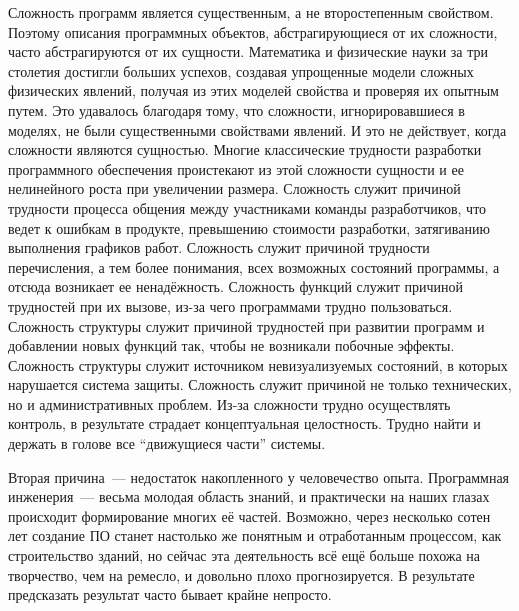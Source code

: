 \documentclass{../../text-style}
\begin{document}
Сложность программ является существенным, а не второстепенным свойством. Поэтому описания программных объектов, абстрагирующиеся от их сложности, часто абстрагируются от их сущности. Математика и физические науки за три столетия достигли больших успехов, создавая упрощенные модели сложных физических явлений, получая из этих моделей свойства и проверяя их опытным путем. Это удавалось благодаря тому, что сложности, игнорировавшиеся в моделях, не были существенными свойствами явлений. И это не действует, когда сложности являются сущностью. Многие классические трудности разработки программного обеспечения проистекают из этой сложности сущности и ее нелинейного роста при увеличении размера. Сложность служит причиной трудности процесса общения между участниками команды разработчиков, что ведет к ошибкам в продукте, превышению стоимости разработки, затягиванию выполнения графиков работ. Сложность служит причиной трудности перечисления, а тем более понимания, всех возможных состояний программы, а отсюда возникает ее ненадёжность. Сложность функций служит причиной трудностей при их вызове, из-за чего программами трудно пользоваться. Сложность структуры служит причиной трудностей при развитии программ и добавлении новых функций так, чтобы не возникали побочные эффекты. Сложность структуры служит источником невизуализуемых состояний, в которых нарушается система защиты. Сложность служит причиной не только технических, но и административных проблем. Из-за сложности трудно осуществлять контроль, в результате страдает концептуальная целостность. Трудно найти и держать в голове все \enquote{движущиеся части} системы. 

Вторая причина~--- недостаток накопленного у человечество опыта. Программная инженерия~--- весьма молодая область знаний, и практически на наших глазах происходит формирование многих её частей. Возможно, через несколько сотен лет создание ПО станет настолько же понятным и отработанным процессом, как строительство зданий, но сейчас эта деятельность всё ещё больше похожа на творчество, чем на ремесло, и довольно плохо прогнозируется. В результате предсказать результат часто бывает крайне непросто.
\end{document}
